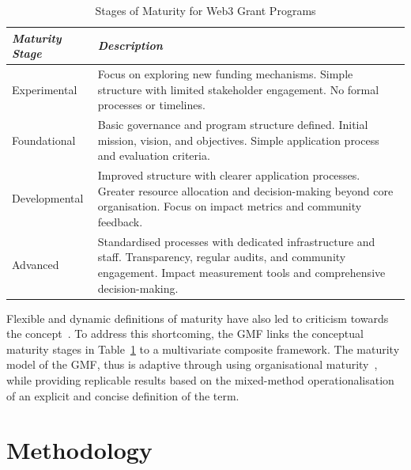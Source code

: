 \documentclass[conference]{IEEEtran}
\begin{document}
\begin{table}[htbp]
\caption{Stages of Maturity for Web3 Grant Programs}
\centering
\footnotesize
\begin{tabular}{p{2cm}p{6cm}}
\hline
\textbf{\textit{Maturity Stage}} & \textbf{\textit{Description}} \\
\hline
Experimental & Focus on exploring new funding mechanisms. Simple structure with limited stakeholder engagement. No formal processes or timelines. \\
\hline
Foundational & Basic governance and program structure defined. Initial mission, vision, and objectives. Simple application process and evaluation criteria. \\
\hline
Developmental & Improved structure with clearer application processes. Greater resource allocation and decision-making beyond core organisation. Focus on impact metrics and community feedback. \\
\hline
Advanced & Standardised processes with dedicated infrastructure and staff. Transparency, regular audits, and community engagement. Impact measurement tools and comprehensive decision-making. \\
\hline
\end{tabular}
\label{tab:grant_maturity}
\end{table}

Flexible and dynamic definitions of maturity have also led to criticism towards the concept~\cite[p.~8]{pereira_review_2020}. To address this shortcoming, the GMF links the conceptual maturity stages in Table~\ref{tab:grant_maturity} to a multivariate composite framework. The maturity model of the GMF, thus is adaptive through using organisational maturity~\cite{andersen_e-government_2006,johansson_roadmap_2019}, while providing replicable results based on the mixed-method operationalisation of an explicit and concise definition of the term.

\section{Methodology}\label{sec_3}
\end{document}

